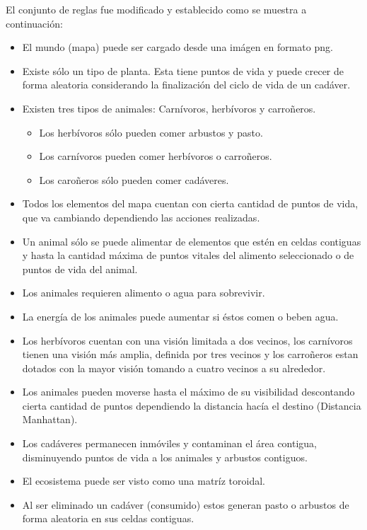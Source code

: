   El conjunto de reglas fue modificado y establecido como se muestra a continuación:
    \begin{itemize}
      \item{El mundo (mapa) puede ser cargado desde una imágen en formato png.}
      \item{Existe sólo un tipo de planta. Esta tiene puntos de vida y puede crecer de forma aleatoria considerando la finalización del ciclo de vida de un cadáver.}
      \item{Existen tres tipos de animales: Carnívoros, herbívoros y carroñeros.}
      \begin{itemize}
        \item{Los herbívoros sólo pueden comer arbustos y pasto.}
        \item{Los carnívoros pueden comer herbívoros o carroñeros.}
        \item{Los caroñeros sólo pueden comer cadáveres.}
      \end{itemize}
      \item{Todos los elementos del mapa cuentan con cierta cantidad de puntos de vida, que va cambiando dependiendo las acciones realizadas.}
      \item{Un animal sólo se puede alimentar de elementos que estén en celdas contiguas y hasta la cantidad máxima de puntos vitales del alimento seleccionado o de puntos de vida del animal.}
      \item{Los animales requieren alimento o agua para sobrevivir.}
      \item{La energía de los animales puede aumentar si éstos comen o beben agua.}
      \item{Los herbívoros cuentan con una visión limitada a dos vecinos, los carnívoros tienen una visión más amplia, definida por tres vecinos y los carroñeros estan dotados con la mayor visión tomando a cuatro vecinos a su alrededor.}
      \item{Los animales pueden moverse hasta el máximo de su visibilidad descontando cierta cantidad de puntos dependiendo la distancia hacía el destino (Distancia Manhattan).}
      \item{Los cadáveres permanecen inmóviles y contaminan el área contigua, disminuyendo puntos de vida a los animales y arbustos contiguos.}
      \item{El ecosistema puede ser visto como una matríz toroidal.}
      \item{Al ser eliminado un cadáver (consumido) estos generan pasto o arbustos de forma aleatoria en sus celdas contiguas.}

\end{itemize}
